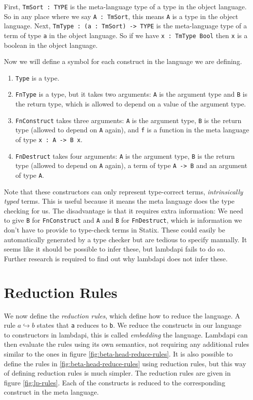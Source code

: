 First, \verb|TmSort : TYPE| is the meta-language type of a type in the object language. So in any place where we say \verb|A : TmSort|, this means \verb|A| is a type in the object language. Next, \verb|TmType : (a : TmSort) -> TYPE| is the meta-language type of a term of type \verb|a| in the object language. So if we have \verb|x : TmType Bool| then \verb|x| is a boolean in the object language. 

Now we will define a symbol for each construct in the language we are defining.
\begin{enumerate}
	\item \verb|Type| is a type.
	\item \verb|FnType| is a type, but it takes two arguments: \verb|A| is the argument type and \verb|B| is the return type, which is allowed to depend on a value of the argument type.
	\item \verb|FnConstruct| takes three arguments: \verb|A| is the argument type, \verb|B| is the return type (allowed to depend on \verb|A| again), and \verb|f| is a function in the meta language of type \verb|x : A -> B x|.
	\item \verb|FnDestruct| takes four arguments: \verb|A| is the argument type, \verb|B| is the return type (allowed to depend on \verb|A| again), a term of type \verb|A -> B| and an argument of type \verb|A|. 
\end{enumerate}

Note that these constructors can only represent type-correct terms, \emph{intrinsically typed} terms. This is useful because it means the meta language does the type checking for us. The disadvantage is that it requires extra information: We need to give \verb|B| for \verb|FnConstruct| and \verb|A| and \verb|B| for \verb|FnDestruct|, which is information we don't have to provide to type-check terms in Statix. These could easily be automatically generated by a type checker but are tedious to specify manually. It seems like it should be possible to infer these, but lambdapi fails to do so. Further research is required to find out why lambdapi does not infer these.

\section{Reduction Rules}

We now define the \emph{reduction rules}, which define how to reduce the language. A rule $a \hookrightarrow b$ states that \verb|a| reduces to \verb|b|. We reduce the constructs in our language to constructors in lambdapi, this is called \emph{embedding} the language. Lambdapi can then evaluate the rules using its own semantics, not requiring any additional rules similar to the ones in figure \ref{fig:beta-head-reduce-rules}. It is also possible to define the rules in \ref{fig:beta-head-reduce-rules} using reduction rules, but this way of defining reduction rules is much simpler. The reduction rules are given in figure \ref{fig:lp-rules}. Each of the constructs is reduced to the corresponding construct in the meta language.


